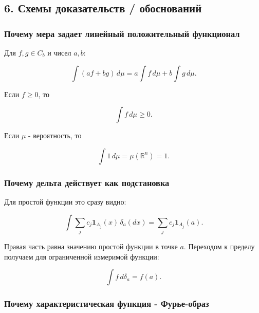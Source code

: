 \documentclass[
  11pt,
  a4paper,
]{article}
\begin{document}
\subsection{6. Схемы доказательств /
обоснований}\label{ux441ux445ux435ux43cux44b-ux434ux43eux43aux430ux437ux430ux442ux435ux43bux44cux441ux442ux432-ux43eux431ux43eux441ux43dux43eux432ux430ux43dux438ux439}

\subsubsection{Почему мера задает линейный положительный
функционал}\label{ux43fux43eux447ux435ux43cux443-ux43cux435ux440ux430-ux437ux430ux434ux430ux435ux442-ux43bux438ux43dux435ux439ux43dux44bux439-ux43fux43eux43bux43eux436ux438ux442ux435ux43bux44cux43dux44bux439-ux444ux443ux43dux43aux446ux438ux43eux43dux430ux43b}

Для \(f,g\in C_b\) и чисел \(a,b\):

\[
\int(af+bg)\,d\mu
=
a\int f\,d\mu+b\int g\,d\mu.
\]

Если \(f\ge0\), то

\[
\int f\,d\mu\ge0.
\]

Если \(\mu\) - вероятность, то

\[
\int 1\,d\mu=\mu(\mathbb R^n)=1.
\]

\subsubsection{Почему дельта действует как
подстановка}\label{ux43fux43eux447ux435ux43cux443-ux434ux435ux43bux44cux442ux430-ux434ux435ux439ux441ux442ux432ux443ux435ux442-ux43aux430ux43a-ux43fux43eux434ux441ux442ux430ux43dux43eux432ux43aux430}

Для простой функции это сразу видно:

\[
\int \sum_j c_j\mathbf 1_{A_j}(x)\,\delta_a(dx)
=
\sum_j c_j\mathbf 1_{A_j}(a).
\]

Правая часть равна значению простой функции в точке \(a\). Переходом к
пределу получаем для ограниченной измеримой функции:

\[
\int f\,d\delta_a=f(a).
\]

\subsubsection{Почему характеристическая функция -
Фурье-образ}\label{ux43fux43eux447ux435ux43cux443-ux445ux430ux440ux430ux43aux442ux435ux440ux438ux441ux442ux438ux447ux435ux441ux43aux430ux44f-ux444ux443ux43dux43aux446ux438ux44f---ux444ux443ux440ux44cux435-ux43eux431ux440ux430ux437}
\end{document}
